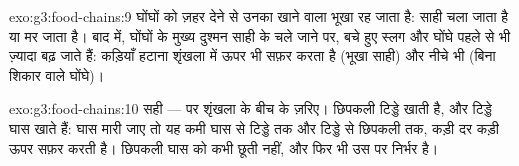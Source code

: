 \begin{solution}{exo:g3:food-chains:9}
घोंघों को ज़हर देने से उनका खाने वाला भूखा रह जाता है: साही चला जाता
है या मर जाता है। बाद में, घोंघों के मुख्य दुश्मन साही के चले जाने पर,
बचे हुए स्लग और घोंघे पहले से भी ज़्यादा बढ़ जाते हैं: कड़ियाँ हटाना
शृंखला में ऊपर भी सफ़र करता है (भूखा साही) और नीचे भी (बिना शिकार वाले
घोंघे)।
\end{solution}

\begin{solution}{exo:g3:food-chains:10}
सही --- पर शृंखला के बीच के ज़रिए। छिपकली टिड्डे खाती है, और टिड्डे
घास खाते हैं: घास मारी जाए तो यह कमी घास से टिड्डे तक और टिड्डे से
छिपकली तक, कड़ी दर कड़ी ऊपर सफ़र करती है। छिपकली घास को कभी छूती नहीं,
और फिर भी उस पर निर्भर है।
\end{solution}
